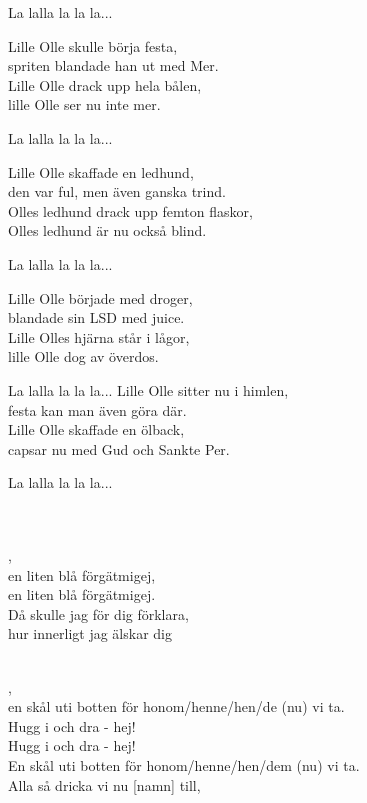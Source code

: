 {{La lalla la la la...

Lille Olle skulle börja festa,\\
spriten blandade han ut med Mer.\\
Lille Olle drack upp hela bålen,\\
lille Olle ser nu inte mer.

La lalla la la la...

Lille Olle skaffade en ledhund,\\
den var ful, men även ganska trind.\\
Olles ledhund drack upp femton flaskor,\\
Olles ledhund är nu också blind.

La lalla la la la...

Lille Olle började med droger,\\
blandade sin LSD med juice.\\
Lille Olles hjärna står i lågor,\\
lille Olle dog av överdos.

La lalla la la la...
\newpage
Lille Olle sitter nu i himlen,\\
festa kan man även göra där.\\
Lille Olle skaffade en ölback,\\
capsar nu med Gud och Sankte Per.

La lalla la la la...

 \\

\vspace{0.15cm}
\melochtext{}\\
,\\
en liten blå förgätmigej, \\
en liten blå förgätmigej. \\
Då skulle jag för dig förklara, \\
hur innerligt jag älskar dig


\newpage 

\vspace{0.15cm}
\melochtext{}\\
,\\
en skål uti botten för honom/henne/hen/de (nu) vi ta.\\
Hugg i och dra - hej!\\
Hugg i och dra - hej!\\
En skål uti botten för honom/henne/hen/dem (nu) vi ta.\\
Alla så dricka vi nu [namn] till,

}}
